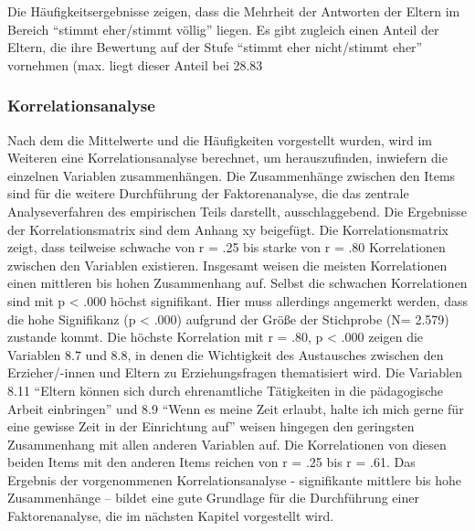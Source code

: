 \documentclass[12pt,a4paper]{article}
\begin{document}
Die Häufigkeitsergebnisse zeigen, dass die Mehrheit der Antworten der Eltern im Bereich "`stimmt eher/stimmt völlig"' liegen. Es gibt zugleich einen Anteil der Eltern, die ihre Bewertung auf der Stufe "`stimmt eher nicht/stimmt eher"' vornehmen (max. liegt dieser Anteil bei 28.83%

\subsubsection{Korrelationsanalyse} 
Nach dem die Mittelwerte und die Häufigkeiten vorgestellt wurden, wird im Weiteren eine Korrelationsanalyse berechnet, um herauszufinden, inwiefern die einzelnen Variablen zusammenhängen. Die Zusammenhänge zwischen den Items sind für die weitere Durchführung der Faktorenanalyse, die das zentrale Analyseverfahren des empirischen Teils darstellt, ausschlaggebend. Die Ergebnisse der Korrelationsmatrix sind dem Anhang xy beigefügt. 
	Die Korrelationsmatrix zeigt, dass teilweise schwache von r = .25 bis starke von r = .80 Korrelationen zwischen den Variablen existieren. Insgesamt weisen die meisten Korrelationen einen mittleren bis hohen Zusammenhang auf. Selbst die schwachen Korrelationen sind mit p < .000 höchst signifikant. Hier muss allerdings angemerkt werden, dass die hohe Signifikanz (p < .000) aufgrund der Größe der Stichprobe (N= 2.579) zustande kommt. Die höchste Korrelation mit r = .80, p < .000 zeigen die Variablen 8.7 und 8.8, in denen die Wichtigkeit des Austausches zwischen den Erzieher/-innen und Eltern zu Erziehungsfragen thematisiert wird. Die Variablen 8.11 "`Eltern können sich durch ehrenamtliche Tätigkeiten in die pädagogische Arbeit einbringen"' und 8.9 "`Wenn es meine Zeit erlaubt, halte ich mich gerne für eine gewisse Zeit in der Einrichtung auf"' weisen hingegen den geringsten Zusammenhang mit allen anderen Variablen auf. Die Korrelationen von diesen beiden Items mit den anderen Items reichen von r = .25 bis r = .61.
	Das Ergebnis der vorgenommenen Korrelationsanalyse - signifikante mittlere bis hohe Zusammenhänge – bildet eine gute Grundlage für die Durchführung einer Faktorenanalyse, die im nächsten Kapitel vorgestellt wird. 
\end{document}

